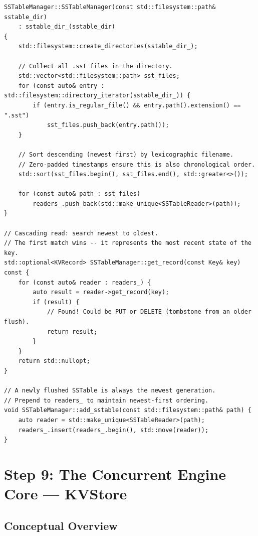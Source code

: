 \documentclass[11pt,a4paper]{article}
\begin{document}
\begin{lstlisting}[style=cpp, caption={SSTable Manager: Startup Scan and Cascading Read: \texttt{src/sstable\_manager.cpp}}]
SSTableManager::SSTableManager(const std::filesystem::path& sstable_dir)
    : sstable_dir_(sstable_dir)
{
    std::filesystem::create_directories(sstable_dir_);

    // Collect all .sst files in the directory.
    std::vector<std::filesystem::path> sst_files;
    for (const auto& entry : std::filesystem::directory_iterator(sstable_dir_)) {
        if (entry.is_regular_file() && entry.path().extension() == ".sst")
            sst_files.push_back(entry.path());
    }

    // Sort descending (newest first) by lexicographic filename.
    // Zero-padded timestamps ensure this is also chronological order.
    std::sort(sst_files.begin(), sst_files.end(), std::greater<>());

    for (const auto& path : sst_files)
        readers_.push_back(std::make_unique<SSTableReader>(path));
}

// Cascading read: search newest to oldest.
// The first match wins -- it represents the most recent state of the key.
std::optional<KVRecord> SSTableManager::get_record(const Key& key) const {
    for (const auto& reader : readers_) {
        auto result = reader->get_record(key);
        if (result) {
            // Found! Could be PUT or DELETE (tombstone from an older flush).
            return result;
        }
    }
    return std::nullopt;
}

// A newly flushed SSTable is always the newest generation.
// Prepend to readers_ to maintain newest-first ordering.
void SSTableManager::add_sstable(const std::filesystem::path& path) {
    auto reader = std::make_unique<SSTableReader>(path);
    readers_.insert(readers_.begin(), std::move(reader));
}
\end{lstlisting}

\section{Step 9: The Concurrent Engine Core --- KVStore}
\label{sec:kvstore}

\subsection{Conceptual Overview}
\end{document}
